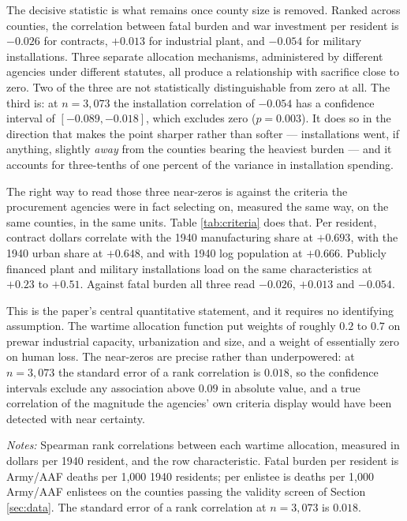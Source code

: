 \documentclass[12pt]{article}
\newcommand{\fittab}[1]{%
  \sbox{\tabbox}{#1}%
  \ifdim\wd\tabbox>\textwidth
    \resizebox{\textwidth}{!}{\usebox{\tabbox}}%
  \else\usebox{\tabbox}\fi}
\begin{document}
The decisive statistic is what remains once county size is removed. Ranked across
counties, the correlation between fatal burden and war investment per resident is
$-0.026$ for contracts, $+0.013$ for industrial plant, and $-0.054$ for military
installations. Three separate allocation mechanisms, administered by different
agencies under different statutes, all produce a relationship with sacrifice
close to zero. Two of the three are not statistically distinguishable from zero
at all. The third is: at $n = 3{,}073$ the installation correlation of $-0.054$
has a confidence interval of $[-0.089, -0.018]$, which excludes zero
($p = 0.003$). It does so in the direction that makes the point sharper rather
than softer --- installations went, if anything, slightly \emph{away} from the
counties bearing the heaviest burden --- and it accounts for three-tenths of one
percent of the variance in installation spending.

The right way to read those three near-zeros is against the criteria the
procurement agencies were in fact selecting on, measured the same way, on the
same counties, in the same units. Table \ref{tab:criteria} does that. Per
resident, contract dollars correlate with the 1940 manufacturing share at
$+0.693$, with the 1940 urban share at $+0.648$, and with 1940 log population at
$+0.666$. Publicly financed plant and military installations load on the same
characteristics at $+0.23$ to $+0.51$. Against fatal burden all three read
$-0.026$, $+0.013$ and $-0.054$.

This is the paper's central quantitative statement, and it requires no
identifying assumption. The wartime allocation function put weights of roughly
$0.2$ to $0.7$ on prewar industrial capacity, urbanization and size, and a
weight of essentially zero on human loss. The near-zeros are precise rather
than underpowered: at $n = 3{,}073$ the standard error of a rank correlation is
$0.018$, so the confidence intervals exclude any association above $0.09$ in
absolute value, and a true correlation of the magnitude the agencies' own
criteria display would have been detected with near certainty.

\begin{table}[!htbp]
\centering
\caption{What the wartime allocation loaded on}
\label{tab:criteria}
\fittab{}
\vspace{2pt}
\begin{minipage}{\textwidth}\footnotesize \textit{Notes:} Spearman rank
correlations between each wartime allocation, measured in dollars per 1940
resident, and the row characteristic. Fatal burden per resident is Army/AAF
deaths per 1{,}000 1940 residents; per enlistee is deaths per 1{,}000 Army/AAF
enlistees on the counties passing the validity screen of Section \ref{sec:data}. The
standard error of a rank correlation at $n = 3{,}073$ is $0.018$.
\end{minipage}
\end{table}
\end{document}
